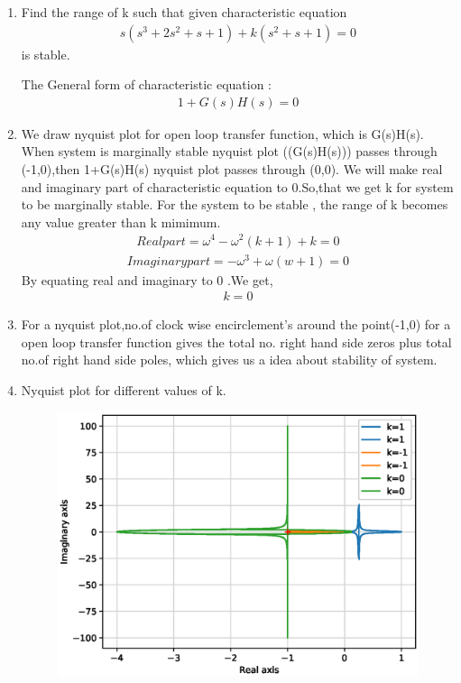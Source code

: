 \begin{enumerate}[label=\thesection.\arabic*.,ref=\thesection.\theenumi]
\item Find the range of k such that given characteristic equation
\begin{align}
s(s^3+2s^2+s+1) +k(s^2+s+1) = 0
\label{eq:ee18btech11042_1}
\end{align}
is stable.

\solution
The General form of characteristic equation :
\begin{align}
1+G(s)H(s) = 0
\label{eq:ee18btech11042_2}    
\end{align}
\item  We draw nyquist plot for open loop transfer function, which is G(s)H(s). When system is marginally stable nyquist plot ((G(s)H(s))) passes through (-1,0),then 1+G(s)H(s) nyquist plot passes through (0,0). We will make real and imaginary part of characteristic equation to 0.So,that  we  get  k for system to be  marginally stable. For the system to be stable , the range of k becomes any value greater than k mimimum.
\begin{align}
Real part = \omega^4 - \omega^2(k+1) +k = 0
\label{eq:ee18btech11042_3}
\end{align}
\begin{align}
Imaginary part = -\omega^3 +\omega(w+1) = 0
\label{eq:ee18btech11042_4}
\end{align}
By equating real and imaginary to 0 .We get,
\begin{align}
 k = 0
\label{eq:ee18btech11042_5}
\end{align}

\item For a nyquist plot,no.of clock wise encirclement's around the point(-1,0) for a open loop transfer function gives the total no. right hand side  zeros plus total no.of right hand side poles, which gives us a idea about stability of system.
\item   Nyquist plot for different values of k.

\begin{figure}[!h]
  \includegraphics[width=\columnwidth]{./figs/ee18btech11042_1.eps}
  \label{fig:ee18btech11042_1.eps}
\end{figure}
 


\end{enumerate}
